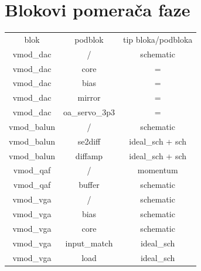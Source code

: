 \documentclass[journal,twocolumn,letterpaper]{IEEEJERM}
\begin{document}

\section{Blokovi pomerača faze}


\begin{center}
  \begin{tabular}{| c | c | c |}
    \hline
    blok & podblok & tip bloka/podbloka \\
    \Xhline{2\arrayrulewidth}
    vmod\_dac & / & schematic \\
    \hline
    vmod\_dac & core & = \\ 
    \hline
    vmod\_dac & bias & = \\
    \hline
    vmod\_dac  & mirror & = \\
    \hline
    vmod\_dac & oa\_servo\_3p3 & = \\
    \Xhline{2\arrayrulewidth}
    vmod\_balun & / & schematic \\
    \hline
    vmod\_balun & se2diff & ideal\_sch + sch \\
    \hline
    vmod\_balun & diffamp & ideal\_sch + sch \\
    \Xhline{2\arrayrulewidth}
    vmod\_qaf & / & momentum\\
    \hline
    vmod\_qaf & buffer & schematic\\
    \Xhline{2\arrayrulewidth}
    vmod\_vga &  / & schematic\\
    \hline
    vmod\_vga & bias & schematic \\
    \hline
    vmod\_vga & core & schematic \\
    \hline
    vmod\_vga & input\_match & ideal\_sch \\
    \hline
    vmod\_vga & load & ideal\_sch \\
    \hline
  \end{tabular}
\end{center}
\end{document}
